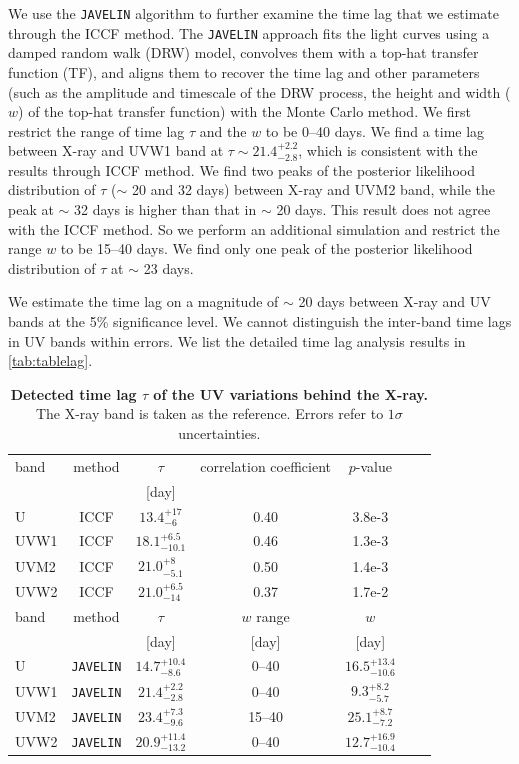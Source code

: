 We use the \texttt{JAVELIN} algorithm \citep[][]{2011ApJ...735...80Z,2013ApJ...765..106Z} to further examine the time lag that we estimate through the ICCF method. The \texttt{JAVELIN} approach fits the light curves using a damped random walk (DRW) model, convolves them with a top-hat transfer function (TF), and aligns them to recover the time lag and other parameters (such as the amplitude and timescale of the DRW process, the height and width ($w$) of the top-hat transfer function) with the Monte Carlo method. We first restrict the range of time lag $\tau$ and the $w$ to be 0--40 days. We find a time lag between X-ray and UVW1 band at $\tau \sim 21.4^{+2.2}_{-2.8}$, which is consistent with the results through ICCF method. We find two peaks of the posterior likelihood distribution of $\tau$ ($\sim$ 20 and 32 days) between X-ray and UVM2 band, while the peak at $\sim$ 32 days is higher than that in $\sim$ 20 days. This result does not agree with the ICCF method. So we perform an additional simulation and restrict the range $w$ to be 15--40 days. We find only one peak of the posterior likelihood distribution of $\tau$ at $\sim$ 23 days. 

We estimate the time lag on a magnitude of $\sim $ 20 days between X-ray and UV bands at the 5\% significance level. We cannot distinguish the inter-band time lags in UV bands within errors. We list the detailed time lag analysis results in \autoref{tab:tablelag}.
%
\begin{table}
\renewcommand{\arraystretch}{1.5}
\centering
\caption{{\bf Detected time lag $\tau$ of the UV variations behind the X-ray.} The X-ray band is taken as the reference. Errors refer to $1\sigma$ uncertainties.}
\label{tab:tablelag}
\begin{tabular}{lcccccr}
\hline
\hline
 band & method & $\tau$ & correlation coefficient & $p$-value   \\ 
      &        &  [day] &                         &             \\ \hline
U     & ICCF &  $13.4 ^{+17}_{-6} $ & 0.40 & 3.8e-3  \\
UVW1  & ICCF &  $18.1 ^{+6.5}_{-10.1} $ & 0.46 & 1.3e-3 \\
UVM2  & ICCF &  $21.0 ^{+8}_{-5.1} $ & 0.50 & 1.4e-3 \\
UVW2  & ICCF &  $21.0 ^{+6.5}_{-14} $ & 0.37 & 1.7e-2 \\
\hline \hline
band & method & $\tau$ & $w$ range &  $w$  \\ 
     &        &  [day] & [day]  &    [day]  \\ \hline 
U     & \texttt{JAVELIN} &  $ 14.7^{+10.4}_{-8.6} $ & 0--40 & $16.5 ^{+13.4}_{-10.6} $ \\
UVW1  & \texttt{JAVELIN} &  $ 21.4 ^{+2.2}_{-2.8} $  & 0--40 & $9.3 ^{+8.2}_{-5.7} $  \\
UVM2  & \texttt{JAVELIN} &  $ 23.4^{+7.3}_{-9.6} $  & 15--40 &  $ 25.1^{+8.7}_{-7.2} $  \\
UVW2  & \texttt{JAVELIN} &  $ 20.9 ^{+11.4}_{-13.2} $  & 0--40&  $ 12.7 ^{+16.9}_{-10.4} $ \\
\hline \hline
\end{tabular}   
\end{table}




